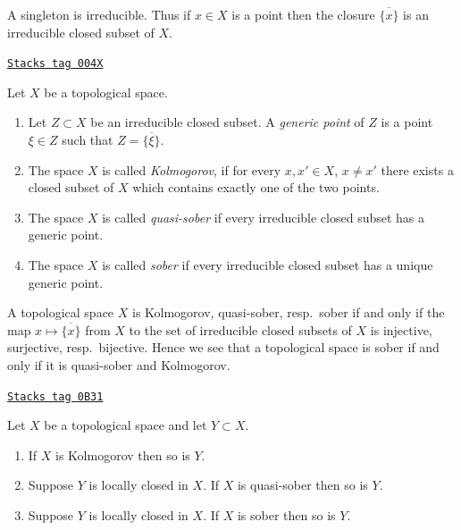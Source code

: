 A singleton is irreducible. Thus if $x \in X$ is a point
then the closure $\overline{\{x\}}$ is an irreducible closed
subset of $X$.

\begin{definition}
\label{topology-definition-generic-point}
\href{https://stacks.math.columbia.edu/tag/004X}{\texttt{Stacks tag 004X}}

Let $X$ be a topological space.
\begin{enumerate}
\item Let $Z \subset X$ be an irreducible closed subset.
A {\it generic point} of $Z$ is a point $\xi \in Z$ such
that $Z = \overline{\{\xi\}}$.
\item The space $X$ is called {\it Kolmogorov}, if for every $x, x' \in X$,
$x \not = x'$ there exists a closed subset of $X$ which contains
exactly one of the two points.
\item The space $X$ is called {\it quasi-sober} if every
irreducible closed subset has a generic point.
\item The space $X$ is called {\it sober} if every
irreducible closed subset has a unique generic point.
\end{enumerate}
\end{definition}

A topological space $X$ is Kolmogorov, quasi-sober, resp.\ sober if and
only if the map $x\mapsto\overline{\{x\}}$ from $X$ to the set of
irreducible closed subsets of $X$ is injective, surjective, resp.\ bijective.
Hence we see that a topological space is sober if and only if it is
quasi-sober and Kolmogorov.

\begin{lemma}
\label{topology-lemma-sober-subspace}
\href{https://stacks.math.columbia.edu/tag/0B31}{\texttt{Stacks tag 0B31}}

Let $X$ be a topological space and let $Y\subset X$.
\begin{enumerate}
\item If $X$ is Kolmogorov then so is $Y$.
\item Suppose $Y$ is locally closed in $X$. If $X$ is quasi-sober then
so is $Y$.
\item Suppose $Y$ is locally closed in $X$. If $X$ is sober then so is $Y$.
\end{enumerate}
\end{lemma}

